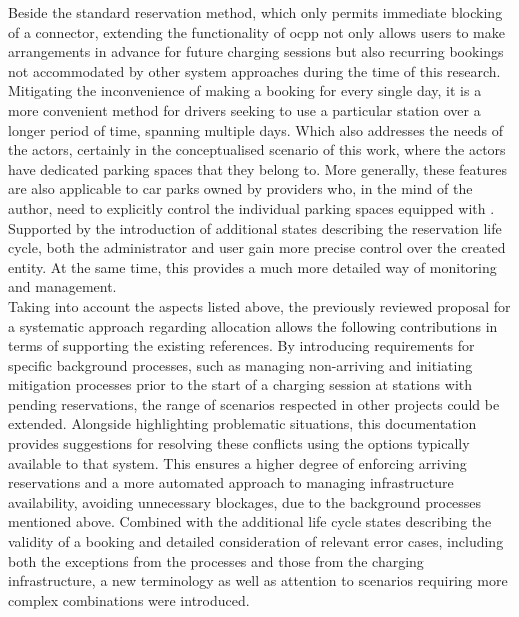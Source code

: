 Beside the standard reservation method, which only permits immediate blocking of a connector, extending the functionality of \acrshort{ocpp} not only allows users to make arrangements in advance for future charging sessions but also recurring bookings not accommodated by other system approaches during the time of this research.
Mitigating the inconvenience of making a booking for every single day, it is a more convenient method for drivers seeking to use a particular station over a longer period of time, spanning multiple days. Which also addresses the needs of the actors, certainly in the conceptualised scenario of this work, where the actors have dedicated parking spaces that they belong to.
More generally, these features are also applicable to car parks owned by providers who, in the mind of the author, need to explicitly control the individual parking spaces equipped with .
Supported by the introduction of additional states describing the reservation life cycle, both the administrator and user gain more precise control over the created entity. At the same time, this provides a much more detailed way of monitoring and management.  \\
\noindent Taking into account the aspects listed above, the previously reviewed proposal for a systematic approach regarding  allocation allows the following contributions in terms of supporting the existing references.
By introducing requirements for specific background processes, such as managing non-arriving  and initiating mitigation processes prior to the start of a charging session at stations with pending reservations, the range of scenarios respected in other projects could be extended.
Alongside highlighting problematic situations, this documentation provides suggestions for resolving these conflicts using the options typically available to that system.
This ensures a higher degree of enforcing arriving reservations and a more automated approach to managing infrastructure availability, avoiding unnecessary blockages, due to the background processes mentioned above. 
Combined with the additional life cycle states describing the validity of a booking and detailed consideration of relevant error cases, including both the exceptions from the processes and those from the charging infrastructure, a new terminology as well as attention to scenarios requiring more complex combinations were introduced.
